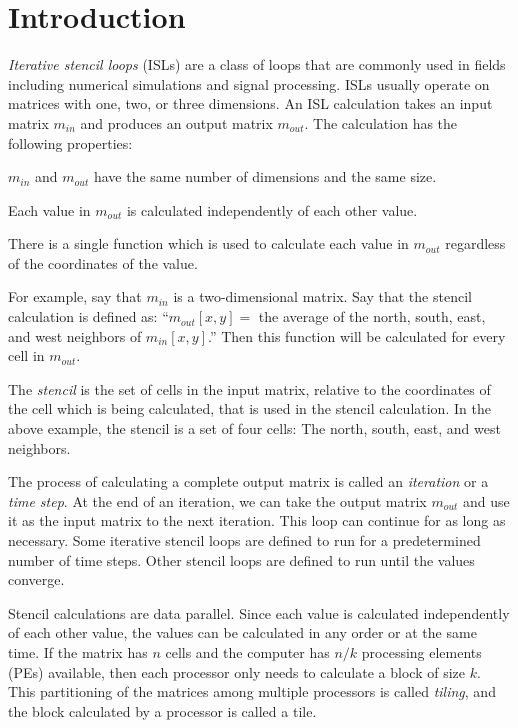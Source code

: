 \documentclass{styles/sig-alternate}
\begin{document}
\section{Introduction}

{\em Iterative stencil loops} (ISLs) \cite{li} are a class of loops
that are commonly used in fields including numerical simulations and
signal processing.  ISLs usually operate on matrices with one, two, or
three dimensions.  An ISL calculation takes an input matrix $m_{in}$
and produces an output matrix $m_{out}$.  The calculation has the
following properties:

\begin{enumerate*}
\item $m_{in}$ and $m_{out}$ have the same number of dimensions and
  the same size.
\item Each value in $m_{out}$ is calculated independently of each
  other value.
\item There is a single function which is used to calculate each value
  in $m_{out}$ regardless of the coordinates of the value.
\end{enumerate*}

For example, say that $m_{in}$ is a two-dimensional matrix.  Say that
the stencil calculation is defined as: ``$m_{out}[x, y] =$ the average
of the north, south, east, and west neighbors of $m_{in}[x, y]$.''
Then this function will be calculated for every cell in $m_{out}$.

The {\em stencil} is the set of cells in the input matrix, relative to
the coordinates of the cell which is being calculated, that is used in
the stencil calculation.  In the above example, the stencil is a set
of four cells: The north, south, east, and west neighbors.

The process of calculating a complete output matrix is called an {\em
  iteration} or a {\em time step}.  At the end of an iteration, we can
take the output matrix $m_{out}$ and use it as the input matrix to the
next iteration.  This loop can continue for as long as necessary.
Some iterative stencil loops are defined to run for a predetermined
number of time steps.  Other stencil loops are defined to run until
the values converge.

Stencil calculations are data parallel.  Since each value is
calculated independently of each other value, the values can be
calculated in any order or at the same time.  If the matrix has $n$
cells and the computer has $n/k$ processing elements (PEs) available,
then each processor only needs to calculate a block of size $k$.  This
partitioning of the matrices among multiple processors is called
{\em tiling}, and the block calculated by a processor is called a
tile.
\end{document}
